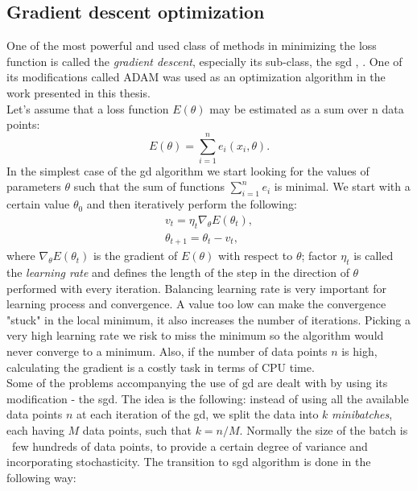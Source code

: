 \subsection{Gradient descent optimization}
One of the most powerful and used class of methods in minimizing the loss function is called the \textit{gradient descent}, \cite{gradient} especially its sub-class, the \gls{sgd} \cite{sgd1}, \cite{sgd2}. One of its modifications called ADAM \cite{kingma2014method} was used as an optimization algorithm in the work presented in this thesis. \\
Let's assume that a loss function $E(\theta)$ may be estimated as a sum over n data points:
\begin{equation}
E(\theta) = \sum^n_{i=1} e_i(x_i,\theta).
\end{equation}
In the simplest case of the \gls{gd} algorithm we start looking for the values of parameters $\theta$ such that the sum of functions $\sum^n_{i=1}e_i$ is minimal. We start with a certain value $\theta_0$ and then iteratively perform the following:
\begin{equation}
\begin{array}{lcl} 
v_t=\eta_t\nabla_{\theta}E(\theta_t),\\
\theta_{t+1}=\theta_t-v_t,
\end{array} 
\end{equation}
where $\nabla_{\theta}E(\theta_t)$ is the gradient of $E(\theta)$ with respect to $\theta$; factor $\eta_t$ is called the \textit{learning rate} and defines the length of the step in the direction of $\theta$ performed with every iteration. Balancing learning rate is very important for learning process and convergence. A value too low can make the convergence "stuck" in the local minimum, it also increases the number of iterations. Picking a very high learning rate we risk to miss the minimum so the algorithm would never converge to a minimum. Also, if the number of data points $n$ is high, calculating the gradient is a costly task in terms of CPU time. \\
Some of the problems accompanying the use of \gls{gd} are dealt with by using its modification - the \gls{sgd}. The idea is the following: instead of using all the available data points $n$ at each iteration of the \gls{gd}, we split the data into $k$ \textit{minibatches}, each having $M$ data points, such that $k = n/M$. Normally the size of the batch is ~few hundreds of data points, to provide a certain degree of variance and incorporating stochasticity. The transition to \gls{sgd} algorithm is done in the following way:
